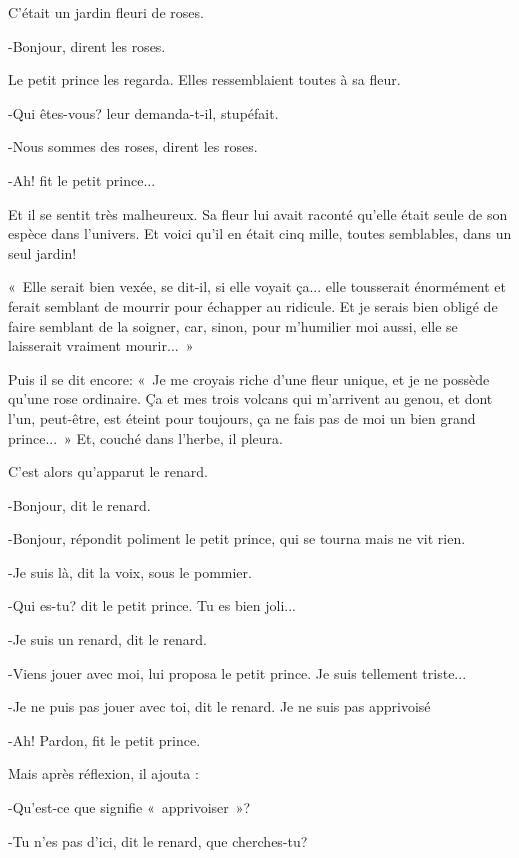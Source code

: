 \documentclass{report}
\begin{document}
C'était un jardin fleuri de roses.

-Bonjour, dirent les roses.

Le petit prince les regarda. Elles ressemblaient toutes à sa fleur.

-Qui êtes-vous? leur demanda-t-il, stupéfait.

-Nous sommes des roses, dirent les roses.

-Ah! fit le petit prince...

Et il se sentit très malheureux. Sa fleur lui avait raconté qu'elle était seule de son espèce dans l'univers. Et voici qu'il en était cinq mille, toutes semblables, dans un seul jardin!


«~Elle serait bien vexée, se dit-il, si elle voyait ça... elle tousserait énormément et ferait semblant de mourrir pour échapper au ridicule. Et je serais bien obligé de faire semblant de la soigner, car, sinon, pour m'humilier moi aussi, elle se laisserait vraiment mourir...~»

Puis il se dit encore: «~Je me croyais riche d'une fleur unique, et je ne possède qu'une rose ordinaire. Ça et mes trois volcans qui m'arrivent au genou, et dont l'un, peut-être, est éteint pour toujours, ça ne fais pas de moi un bien grand prince...~» Et, couché dans l'herbe, il pleura. 


\parachapter{} %
C'est alors qu'apparut le renard.

-Bonjour, dit le renard.

-Bonjour, répondit poliment le petit prince, qui se tourna mais ne vit rien.

-Je suis là, dit la voix, sous le pommier.

-Qui es-tu? dit le petit prince. Tu es bien joli...


-Je suis un renard, dit le renard.

-Viens jouer avec moi, lui proposa le petit prince. Je suis tellement triste...

-Je ne puis pas jouer avec toi, dit le renard. Je ne suis pas apprivoisé

-Ah! Pardon, fit le petit prince.

Mais après réflexion, il ajouta :

-Qu'est-ce que signifie «~apprivoiser~»?

-Tu n'es pas d'ici, dit le renard, que cherches-tu?
\end{document}
